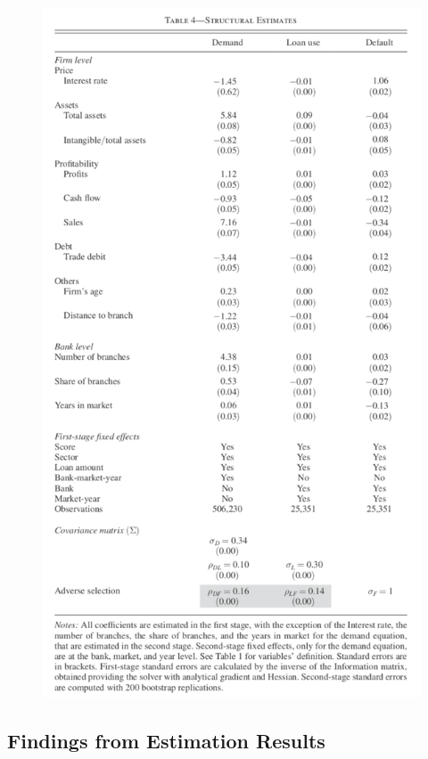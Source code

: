\documentclass[]{book}
\begin{document}
\begin{figure}
\centering
\includegraphics{figuretable/Crawford_2018_Table4.png}
\caption{}
\end{figure}

\subsection{Findings from Estimation
Results}\label{findings-from-estimation-results}
\end{document}

